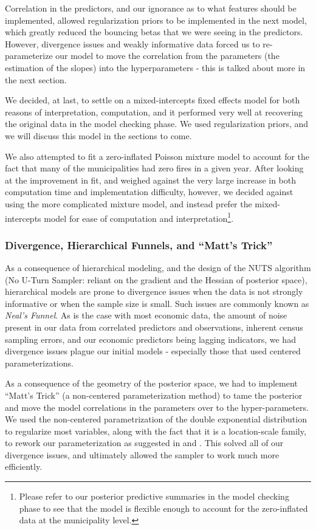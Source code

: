 \documentclass[10pt,a4paper, hidelinks]{article} %
\begin{document}
Correlation in the predictors, and our ignorance as to what features should be implemented, allowed regularization priors to be implemented in the next model, which greatly reduced the bouncing betas that we were seeing in the predictors. However, divergence issues and weakly informative data forced us to re-parameterize our model to move the correlation from the parameters (the estimation of the slopes) into the hyperparameters - this is talked about more in the next section. 

We decided, at last, to settle on a mixed-intercepts fixed effects model for both reasons of interpretation, computation, and it performed very well at recovering the original data in the model checking phase. We used regularization priors, and we will discuss this model in the sections to come. 

We also attempted to fit a zero-inflated Poisson mixture model to account for the fact that many of the municipalities had zero fires in a given year. After looking at the improvement in fit, and weighed against the very large increase in both computation time and implementation difficulty, however, we decided against using the more complicated mixture model, and instead prefer the mixed-intercepts model for ease of computation and interpretation\footnote{Please refer to our posterior predictive summaries in the model checking phase to see that the model is flexible enough to account for the zero-inflated data at the municipality level.}. 

\subsubsection{Divergence, Hierarchical Funnels, and ``Matt's Trick''}
As a consequence of hierarchical modeling, and the design of the NUTS algorithm (No U-Turn Sampler: reliant on the gradient and the Hessian of posterior space), hierarchical models are prone to divergence issues when the data is not strongly informative or when the sample size is small. Such issues are commonly known as \textit{Neal's Funnel}. As is the case with most economic data, the amount of noise present in our data from correlated predictors and observations, inherent census sampling errors, and our economic predictors being lagging indicators, we had divergence issues plague our initial models - especially those that used centered parameterizations. 

As a consequence of the geometry of the posterior space, we had to implement ``Matt's Trick'' (a non-centered parameterization method) to tame the posterior and move the model correlations in the parameters over to the hyper-parameters. We used the non-centered parametrization of the double exponential distribution to regularize most variables, along with the fact that it is a location-scale family, to rework our parameterization as suggested in \cite{stanmanual} and \cite{benacourt}. This solved all of our divergence issues, and ultimately allowed the sampler to work much more efficiently.
\end{document}
